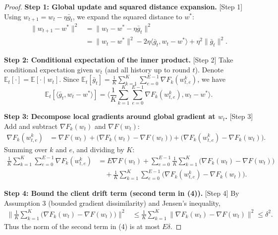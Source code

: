 \documentclass{article}
\begin{document}
\begin{proof}
\noindent \textbf{Step 1: Global update and squared distance expansion.} [Step 1]
Using $w_{t+1} = w_t - \eta \bar{g}_t$, we expand the squared distance to $w^*$:
\begin{align}
\|w_{t+1} - w^*\|^2 &= \|w_t - w^* - \eta \bar{g}_t\|^2 \\
&= \|w_t - w^*\|^2 - 2\eta \langle \bar{g}_t, w_t - w^* \rangle + \eta^2 \|\bar{g}_t\|^2. \tag{1}
\end{align}

\noindent \textbf{Step 2: Conditional expectation of the inner product.} [Step 2]
Take conditional expectation given $w_t$ (and all history up to round $t$). Denote $\mathbb{E}_t[\cdot] = \mathbb{E}[\cdot \mid w_t]$. Since $\mathbb{E}_t[\bar{g}_t] = \frac{1}{K}\sum_{k=1}^K \sum_{e=0}^{E-1} \nabla F_k(w_{t,e}^k)$, we have
\begin{equation}
\mathbb{E}_t[\langle \bar{g}_t, w_t - w^* \rangle] = \Big\langle \frac{1}{K}\sum_{k=1}^K \sum_{e=0}^{E-1} \nabla F_k(w_{t,e}^k), w_t - w^* \Big\rangle. \tag{2}
\end{equation}

\noindent \textbf{Step 3: Decompose local gradients around global gradient at $w_t$.} [Step 3]
Add and subtract $\nabla F_k(w_t)$ and $\nabla F(w_t)$:
\begin{align}
\nabla F_k(w_{t,e}^k) &= \nabla F(w_t) + \big(\nabla F_k(w_t) - \nabla F(w_t)\big) + \big(\nabla F_k(w_{t,e}^k) - \nabla F_k(w_t)\big). \tag{3}
\end{align}
Summing over $k$ and $e$, and dividing by $K$:
\begin{align}
\frac{1}{K}\sum_{k=1}^K \sum_{e=0}^{E-1} \nabla F_k(w_{t,e}^k) &= E \nabla F(w_t) + \sum_{e=0}^{E-1} \frac{1}{K}\sum_{k=1}^K \big(\nabla F_k(w_t) - \nabla F(w_t)\big) \\
&\quad + \frac{1}{K}\sum_{k=1}^K \sum_{e=0}^{E-1} \big(\nabla F_k(w_{t,e}^k) - \nabla F_k(w_t)\big). \tag{4}
\end{align}

\noindent \textbf{Step 4: Bound the client drift term (second term in (4)).} [Step 4]
By Assumption 3 (bounded gradient dissimilarity) and Jensen's inequality,
\begin{align}
\Big\|\frac{1}{K}\sum_{k=1}^K \big(\nabla F_k(w_t) - \nabla F(w_t)\big)\Big\|^2 
&\le \frac{1}{K}\sum_{k=1}^K \|\nabla F_k(w_t) - \nabla F(w_t)\|^2 \le \delta^2. \tag{5}
\end{align}
Thus the norm of the second term in (4) is at most $E\delta$.


\end{proof}
\end{document}
